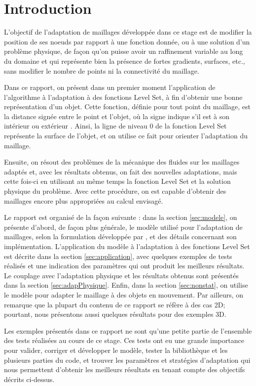 \section{Introduction}

\indent L'objectif de l'adaptation de maillages développée dans ce stage est de modifier la position de ses noeuds par rapport à une fonction donnée, ou à une solution d'un problème physique, de façon qu'on puisse avoir un raffinement variable au long du domaine et qui représente bien la présence de fortes gradients, surfaces, etc., sans modifier le nombre de points ni la connectivité du maillage.

\indent Dans ce rapport, on présent dans un premier moment l'application de l'algorithme à l'adaptation à des fonctions Level Set, à fin d'obtenir une bonne représentation d'un objet. Cette fonction, définie pour tout point du maillage, est la distance signée entre le point et l'objet, où la signe indique s'il est à son intérieur ou extérieur \cite{ducrot}. Ainsi, la ligne de niveau 0 de la fonction Level Set représente la surface de l'objet, et on utilise ce fait pour orienter l'adaptation du maillage.

\indent Ensuite, on résout des problèmes de la mécanique des fluides sur les maillages adaptés et, avec les résultats obtenus, on fait des nouvelles adaptations, mais cette fois-ci en utilisant au même temps la fonction Level Set et la solution physique du problème. Avec cette procédure, on est capable d'obtenir des maillages encore plus appropriées au calcul envisagé. 

\indent Le rapport est organisé de la façon suivante : dans la section \ref{sec:modele}, on présente d'abord, de façon plus générale, le modèle utilisé pour l'adaptation de maillages, selon la formulation développée par \cite{arpaia}, et des détails concernant son implémentation. L'application du modèle à l'adaptation à des fonctions Level Set est décrite dans la section \ref{sec:application}, avec quelques exemples de tests réalisés et une indication des paramètres qui ont produit les meilleurs résultats. Le couplage avec l'adaptation physique et les résultats obtenus sont présentés dans la section \ref{sec:adapPhysique}. Enfin, dans la section \ref{sec:nonstat}, on utilise le modèle pour adapter le maillage à des objets en mouvement. Par ailleurs, on remarque que la plupart du contenu de ce rapport se réfère à des cas 2D; pourtant, nous présentons aussi quelques résultats pour des exemples 3D.

\indent Les exemples présentés dans ce rapport ne sont qu'une petite partie de l'ensemble des tests réalisées au cours de ce stage. Ces tests ont eu une grande importance pour valider, corriger et développer le modèle, tester la bibliothèque et les plusieurs parties du code, et trouver les paramètres et stratégies d'adaptation qui nous permettent d'obtenir les meilleurs résultats en tenant compte des objectifs décrits ci-dessus.